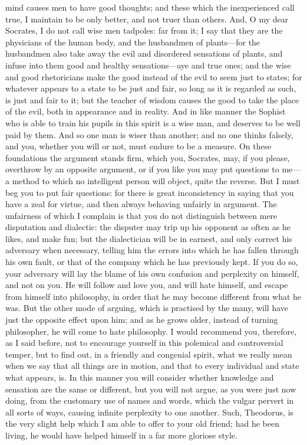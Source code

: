 \documentclass[11pt,letter]{article}
\begin{document}
mind causes men to have good thoughts; and these which the inexperienced call true, I maintain to be only better, and not truer than others. And, O my dear Socrates, I do not call wise men tadpoles:  far from it; I say that they are the physicians of the human body, and the husbandmen of plants—for the husbandmen also take away the evil and disordered sensations of plants, and infuse into them good and healthy sensations—aye and true ones; and the wise and good rhetoricians make the good instead of the evil to seem just to states; for whatever appears to a state to be just and fair, so long as it is regarded as such, is just and fair to it; but the teacher of wisdom causes the good to take the place of the evil, both in appearance and in reality. And in like manner the Sophist who is able to train his pupils in this spirit is a wise man, and deserves to be well paid by them. And so one man is wiser than another; and no one thinks falsely, and you, whether you will or not, must endure to be a measure. On these foundations the argument stands firm, which you, Socrates, may, if you please, overthrow by an opposite argument, or if you like you may put questions to me—a method to which no intelligent person will object, quite the reverse. But I must beg you to put fair questions:  for there is great inconsistency in saying that you have a zeal for virtue, and then always behaving unfairly in argument. The unfairness of which I complain is that you do not distinguish between mere disputation and dialectic:  the disputer may trip up his opponent as often as he likes, and make fun; but the dialectician will be in earnest, and only correct his adversary when necessary, telling him the errors into which he has fallen through his own fault, or that of the company which he has previously kept. If you do so, your adversary will lay the blame of his own confusion and perplexity on himself, and not on you. He will follow and love you, and will hate himself, and escape from himself into philosophy, in order that he may become different from what he was. But the other mode of arguing, which is practised by the many, will have just the opposite effect upon him; and as he grows older, instead of turning philosopher, he will come to hate philosophy. I would recommend you, therefore, as I said before, not to encourage yourself in this polemical and controversial temper, but to find out, in a friendly and congenial spirit, what we really mean when we say that all things are in motion, and that to every individual and state what appears, is. In this manner you will consider whether knowledge and sensation are the same or different, but you will not argue, as you were just now doing, from the customary use of names and words, which the vulgar pervert in all sorts of ways, causing infinite perplexity to one another. Such, Theodorus, is the very slight help which I am able to offer to your old friend; had he been living, he would have helped himself in a far more gloriose style.
\end{document}
